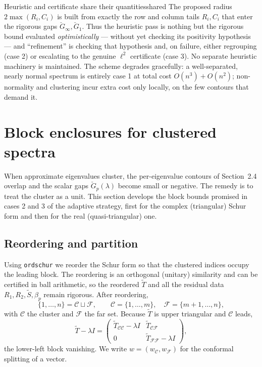 \documentclass[11pt, a4paper]{article}
\numberwithin{equation}{section}
\newcommand{\tT}{\widetilde{T}}
\begin{document}
\begin{remark}{Heuristic and certificate share their quantities}{shared}
  The proposed radius $2\max(R_i, C_i)$ is built from exactly the row and column
  tails $R_i, C_i$ that enter the rigorous gaps $\check G_\infty, \check G_1$.
  Thus the heuristic pass is nothing but the rigorous bound evaluated
  \emph{optimistically} --- without yet checking its positivity hypothesis ---
  and ``refinement'' is checking that hypothesis and, on failure, either
  regrouping (case 2) or escalating to the genuine $\ell^2$ certificate
  (case 3).  No separate heuristic machinery is maintained.  The scheme degrades
  gracefully: a well-separated, nearly normal spectrum is entirely case 1 at
  total cost $O(n^3) + O(n^2)$; non-normality and clustering incur extra cost
  only locally, on the few contours that demand it.
\end{remark}



\section{Block enclosures for clustered spectra}

When approximate eigenvalues cluster, the per-eigenvalue contours of
Section~2.4 overlap and the scalar gaps $\check G_p(\lambda)$ become small or
negative.  The remedy is to treat the cluster as a unit.  This section develops
the block bounds promised in cases 2 and 3 of the adaptive strategy, first for
the complex (triangular) Schur form and then for the real (quasi-triangular)
one.

\subsection{Reordering and partition}

Using \texttt{ordschur} we reorder the Schur form so that the clustered indices
occupy the leading block.  The reordering is an orthogonal (unitary) similarity
and can be certified in ball arithmetic, so the reordered $\tT$ and all the
residual data $R_1, R_2, \tilde S, \beta_p$ remain rigorous.  After reordering,
\[
  \{1, \ldots, n\} = \mathcal{C} \sqcup \mathcal{F},
  \qquad \mathcal{C} = \{1, \ldots, m\}, \quad \mathcal{F} = \{m+1, \ldots, n\},
\]
with $\mathcal{C}$ the cluster and $\mathcal{F}$ the far set.  Because $\tT$ is
upper triangular and $\mathcal{C}$ leads,
\[
  \tT - \lambda I =
  \begin{pmatrix}
    \tT_{\mathcal{C}\mathcal{C}} - \lambda I & \tT_{\mathcal{C}\mathcal{F}} \\
    0 & \tT_{\mathcal{F}\mathcal{F}} - \lambda I
  \end{pmatrix},
\]
the lower-left block vanishing.  We write $w = (w_{\mathcal{C}}, w_{\mathcal{F}})$
for the conformal splitting of a vector.
\end{document}
